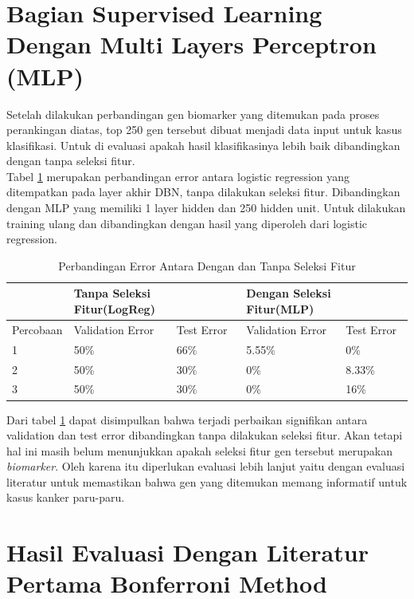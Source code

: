 \section{Bagian Supervised Learning Dengan Multi Layers Perceptron (MLP)}



Setelah dilakukan perbandingan gen biomarker yang ditemukan pada proses perankingan diatas, top 250 gen tersebut dibuat menjadi data input untuk kasus klasifikasi. Untuk di evaluasi apakah hasil klasifikasinya lebih baik dibandingkan dengan tanpa seleksi fitur.\\
Tabel \ref{tab:tabel4.2} merupakan perbandingan error antara logistic regression yang ditempatkan pada layer akhir DBN, tanpa dilakukan seleksi fitur. Dibandingkan dengan MLP yang memiliki 1 layer hidden dan 250 hidden unit. Untuk dilakukan training ulang dan dibandingkan dengan hasil yang diperoleh dari logistic regression.

\begin{table}
\centering
\caption{Perbandingan Error Antara Dengan dan Tanpa Seleksi Fitur}
\label{tab:tabel4.2}
\begin{tabular}{@{}lllll@{}}
\toprule
 & \multicolumn{2}{l}{Tanpa Seleksi Fitur(LogReg)} & \multicolumn{2}{l}{Dengan Seleksi Fitur(MLP)} \\ \midrule
Percobaan & Validation Error & Test Error & Validation Error & Test Error \\
1 & 50\% & 66\% & 5.55\% & 0\% \\
2 & 50\% & 30\% & 0\% & 8.33\% \\
3 & 50\% & 30\% & 0\% & 16\% \\ \bottomrule
\end{tabular}
\end{table}

Dari tabel \ref{tab:tabel4.2} dapat disimpulkan bahwa terjadi perbaikan signifikan antara validation dan test error dibandingkan tanpa dilakukan seleksi fitur. Akan tetapi hal ini masih belum menunjukkan apakah seleksi fitur gen tersebut merupakan \textit{biomarker}. Oleh karena itu diperlukan evaluasi lebih lanjut yaitu dengan evaluasi literatur untuk memastikan bahwa gen yang ditemukan memang informatif untuk kasus kanker paru-paru.

\section{Hasil Evaluasi Dengan Literatur Pertama Bonferroni Method\citep{hochberg1988sharper}}

